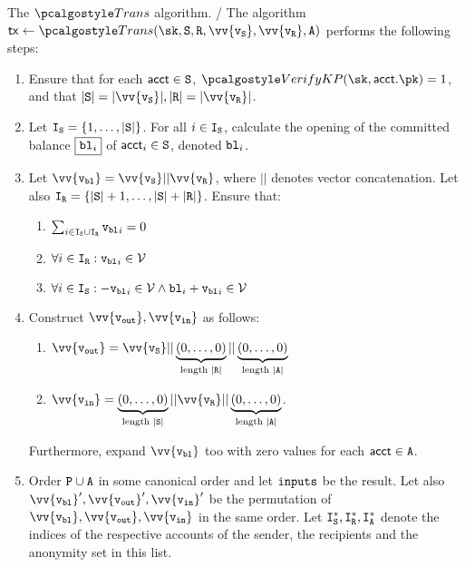 \begin{boxfig}{\label{fig:trans}{The $\trans$ algorithm.}}
    / The algorithm $\txn \gets \trans(\sk,\sset, \rset, \vv{\v_\sset}, \vv{\v_\rset}, \anset)$ performs the following steps:
    \begin{enumerate}
        \item Ensure that for each $\textup{\textsf{acct}} \in \mathtt{S}$, $\verkp(\sk, \acct.\pk) = 1 $, and that $|\sset| = |\vv{\v_\sset}|, |\rset| = |\vv{\v_\rset}|$.
        \item Let $\mathtt{I}_{\mathtt{S}} = \{1, \dots, |\mathtt{S}|\}$. For all $i \in \mathtt{I}_{\mathtt{S}}$, calculate the opening of the committed balance $\fbox{$\textup{\texttt{{bl}}}_i$}$ of $\textup{\textsf{acct}}_i \in \mathtt{S}$, denoted $\textup{\texttt{{bl}}}_i$.
        \item Let $\vv{\vbl} = \vv{\v_\sset} || \vv{\v_\rset}$, where $||$ denotes vector concatenation. Let also $\mathtt{I}_{\mathtt{R}} = \{|\mathtt{S}| + 1,\dots, |\mathtt{S}| + |\mathtt{R}|\}$.
        Ensure that:
        \begin{enumerate}
            \item $\sum_{i\in \mathtt{I}_{\mathtt{S}} \cup \mathtt{I}_{\mathtt{R}}} {\textup{\texttt{{v}}}_{\textup{\texttt{{bl}}}}}_i = 0$
            \item $\forall i \in\mathtt{I}_{\mathtt{R}} : {\textup{\texttt{{v}}}_{\textup{\texttt{{bl}}}}}_i \in \mathcal{V}$
            \item $\forall i \in \mathtt{I}_{\mathtt{S}} :-{\textup{\texttt{{v}}}_{\textup{\texttt{{bl}}}}}_i \in \mathcal{V} \wedge \textup{\texttt{{bl}}}_i + {\textup{\texttt{{v}}}_{\textup{\texttt{{bl}}}}}_i \in \mathcal{V}$ 
        \end{enumerate}
                \item Construct $\vv{\vout}, \vv{\vin}$ as follows:
                    \begin{enumerate}
                        \item $\vv{\vout} = \vv{\v_\sset} || \underbrace{(0, \dots, 0)}_{\text{length } |\rset|}|| \underbrace{(0, \dots, 0)}_{\text{length } |\anset|}$
                        \item $\vv{\vin} = \underbrace{(0, \dots, 0)}_{\text{length } |\sset|} || \vv{\v_\rset} || \underbrace{(0, \dots, 0)}_{\text{length } |\anset|}$.
                    \end{enumerate}
                    Furthermore, expand $\vv{\vbl}$ too with zero values for each $\textup{\textsf{acct}} \in {\mathtt{A}}$.
        \item Order $\mathtt{P} \cup {\mathtt{A}}$ in some canonical order and let ${\textup{\texttt{inputs}}}$ be the result. Let also $\vv{{\vbl}}^\prime,\vv{{\vout}}^\prime,\vv{{\vin}}^\prime$ be the permutation of $\vv{\vbl},\vv{\vout},\vv{\vin}$ in the same order.
        Let $\mathtt{I}_{\mathtt{S}}^*, \mathtt{I}_{\mathtt{R}}^*, \mathtt{I}_{\mathtt{A}}^*$ denote the indices of the respective accounts of the sender, the recipients and the anonymity set in this list.

\end{enumerate}
\end{boxfig}
